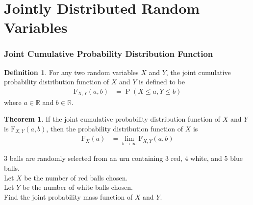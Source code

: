 \documentclass[titlepage, fleqn, a4paper, 12pt, twoside]{article}
\theoremstyle{definition}
\newtheorem{definition}{Definition}
\theoremstyle{theorem}
\newtheorem{theorem}{Theorem}
\DeclareMathOperator{\prob}{\mathrm{P}}
\newcommand*{\cdf}[1]{\mathrm{F}_{#1}}
\begin{document}
\clearpage
\part{Jointly Distributed Random Variables}

\section{Joint Cumulative Probability Distribution Function}

\begin{definition}
	For any two random variables $X$ and $Y$, the joint cumulative probability distribution function of $X$ and $Y$ is defined to be
	\begin{align*}
		\cdf{X,Y}(a,b) & = \prob(X \le a , Y \le b)
	\end{align*}
	where $a \in \mathbb{R}$ and $b \in \mathbb{R}$.
\end{definition}

\begin{theorem}
	If the joint cumulative probability distribution function of $X$ and $Y$ is $\cdf{X,Y}(a,b)$, then the probability distribution function of $X$ is
	\begin{align*}
		\cdf{X}(a) & = \lim\limits_{b \to \infty} \cdf{X,Y}(a,b)
	\end{align*}
\end{theorem}

\begin{question}
	$3$ balls are randomly selected from an urn containing $3$ red, $4$ white, and $5$ blue balls.\\
	Let $X$ be the number of red balls chosen.\\
	Let $Y$ be the number of white balls chosen.\\
	Find the joint probability mass function of $X$ and $Y$.
\end{question}
\end{document}
